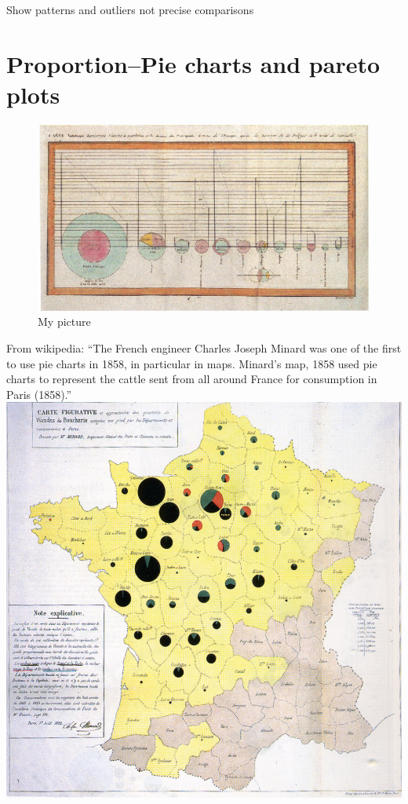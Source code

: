 \documentclass[]{krantz}
\begin{document}
Show patterns and outliers not precise comparisons

\cleardoublepage

\hypertarget{Proportion}{%
\chapter{Proportion--Pie charts and pareto plots}\label{Proportion}}

\begin{figure}
\centering
\includegraphics{images/Playfair_piecharts.jpg}
\caption{My picture}
\end{figure}

From wikipedia: ``The French engineer Charles Joseph Minard was one of the first to use pie charts in 1858, in particular in maps. Minard's map, 1858 used pie charts to represent the cattle sent from all around France for consumption in Paris (1858).''
\includegraphics{images/Minard_pie.png}
\end{document}
